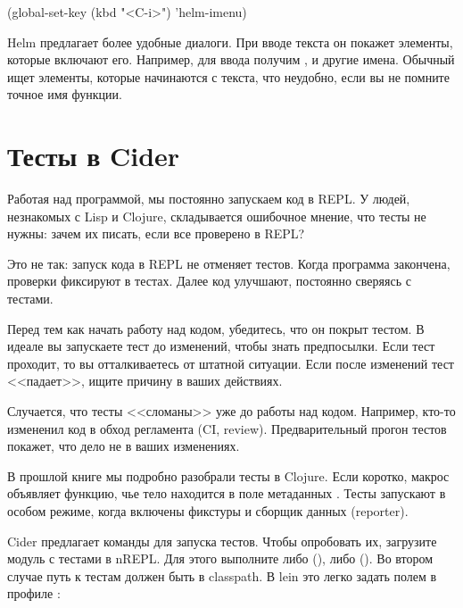 \begin{english}
  \begin{lisp}
(global-set-key (kbd "<C-i>") 'helm-imenu)
  \end{lisp}
\end{english}

Helm предлагает более удобные диалоги. При вводе текста он покажет элементы, которые включают его. Например, для ввода  получим ,  и другие имена. Обычный  ищет элементы, которые начинаются с текста, что неудобно, если вы не помните точное имя функции.

\section{Тесты в Cider}


Работая над программой, мы постоянно запускаем код в REPL. У людей, незнакомых с Lisp и Clojure, складывается ошибочное мнение, что тесты не нужны: зачем их писать, если все проверено в REPL?

Это не так: запуск кода в REPL не отменяет тестов. Когда программа закончена, проверки фиксируют в тестах. Далее код улучшают, постоянно сверяясь с тестами.

Перед тем как начать работу над кодом, убедитесь, что он покрыт тестом. В идеале вы запускаете тест до изменений, чтобы знать предпосылки. Если тест проходит, то вы отталкиваетесь от штатной ситуации. Если после изменений тест <<падает>>, ищите причину в ваших действиях.

Случается, что тесты <<сломаны>> уже до работы над кодом. Например, кто-то измененил код в обход регламента (CI, review). Предварительный прогон тестов покажет, что дело не в ваших изменениях.

В прошлой книге мы подробно разобрали тесты в Clojure. Если коротко, макрос  объявляет функцию, чье тело находится в поле метаданных . Тесты запускают в особом режиме, когда включены фикстуры и сборщик данных (reporter).

Cider предлагает команды для запуска тестов. Чтобы опробовать их, загрузите модуль с тестами в nREPL. Для этого выполните либо  (), либо  (). Во втором случае путь к тестам должен быть в classpath. В lein это легко задать полем  в профиле :

